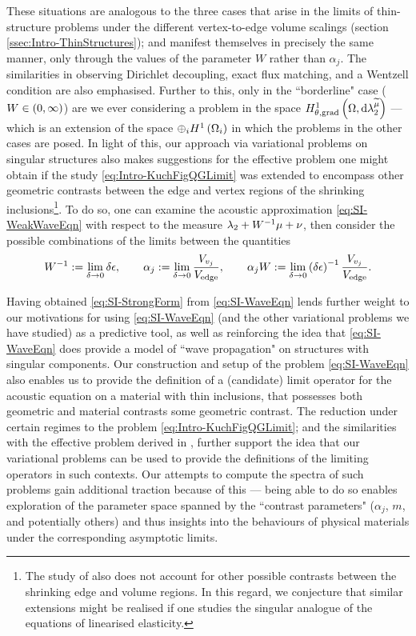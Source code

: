 These situations are analogous to the three cases that arise in the limits of thin-structure problems under the different vertex-to-edge volume scalings (section \ref{ssec:Intro-ThinStructures}); and manifest themselves in precisely the same manner, only through the values of the parameter $W$ rather than $\alpha_j$.
The similarities in observing Dirichlet decoupling, exact flux matching, and a Wentzell condition are also emphasised.
Further to this, only in the ``borderline" case ($W\in\left( 0,\infty \right)$) are we ever considering a problem in the space $H^1_{\theta, \mathrm{grad}}\left( \Omega, \mathrm{d}\lambda_2^{\widetilde{\mu}} \right)$ --- which is an extension of the space $\oplus_{i} H^1\left( \Omega_i \right)$ in which the problems in the other cases are posed.
In light of this, our approach via variational problems on singular structures also makes suggestions for the effective problem one might obtain if the study \eqref{eq:Intro-KuchFigQGLimit} was extended to encompass other geometric contrasts between the edge and vertex regions of the shrinking inclusions\footnote{The study of \cite{cherednichenko2019homogenisation} also does not account for other possible contrasts between the shrinking edge and volume regions. In this regard, we conjecture that similar extensions might be realised if one studies the singular analogue of the equations of linearised  elasticity.}.
To do so, one can examine the acoustic approximation \eqref{eq:SI-WeakWaveEqn} with respect to the measure $\lambda_2 + W^{-1}\mu + \nu$, then consider the possible combinations of the limits between the quantities
\begin{align*}
	W^{-1} := \lim_{\delta\rightarrow0} \delta\epsilon, \qquad
	\alpha_j := \lim_{\delta\rightarrow0} \frac{V_{v_j}}{V_{\text{edge}}}, \qquad
	\alpha_j W := \lim_{\delta\rightarrow0} \left( \delta\epsilon \right)^{-1}\frac{V_{v_j}}{V_{\text{edge}}}.
\end{align*}

Having obtained \eqref{eq:SI-StrongForm} from \eqref{eq:SI-WaveEqn} lends further weight to our motivations for using \eqref{eq:SI-WaveEqn} (and the other variational problems we have studied) as a predictive tool, as well as reinforcing the idea that \eqref{eq:SI-WaveEqn} does provide a model of ``wave propagation" on structures with singular components.
Our construction and setup of the problem \eqref{eq:SI-WaveEqn} also enables us to provide the definition of a (candidate) limit operator for the acoustic equation on a material with thin inclusions, that possesses both geometric and material contrasts some geometric contrast.
The reduction under certain regimes to the problem \eqref{eq:Intro-KuchFigQGLimit}; and the similarities with the effective problem derived in \cite{cherednichenko2019homogenisation}, further support the idea that our variational problems can be used to provide the definitions of the limiting operators in such contexts.
Our attempts to compute the spectra of such problems gain additional traction because of this --- being able to do so enables exploration of the parameter space spanned by the ``contrast parameters" ($\alpha_j$, $m$, and potentially others) and thus insights into the behaviours of physical materials under the corresponding asymptotic limits.